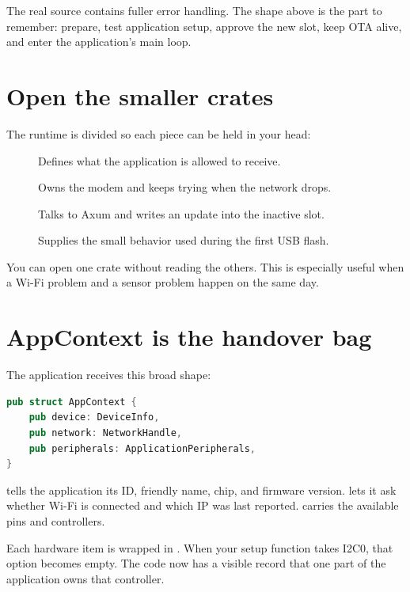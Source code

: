 The real source contains fuller error handling. The shape above is the part to remember: prepare, test application setup, approve the new slot, keep OTA alive, and enter the application's main loop.

\section{Open the smaller crates}

The runtime is divided so each piece can be held in your head:

\begin{description}
  \item[] Defines what the application is allowed to receive.
  \item[] Owns the modem and keeps trying when the network drops.
  \item[] Talks to Axum and writes an update into the inactive slot.
  \item[] Supplies the small behavior used during the first USB flash.
\end{description}

You can open one crate without reading the others. This is especially useful when a Wi-Fi problem and a sensor problem happen on the same day.

\section{AppContext is the handover bag}

The application receives this broad shape:

\begin{lstlisting}[language=Rust]
pub struct AppContext {
    pub device: DeviceInfo,
    pub network: NetworkHandle,
    pub peripherals: ApplicationPeripherals,
}
\end{lstlisting}

 tells the application its ID, friendly name, chip, and firmware version.  lets it ask whether Wi-Fi is connected and which IP was last reported.  carries the available pins and controllers.

Each hardware item is wrapped in . When your setup function takes I2C0, that option becomes empty. The code now has a visible record that one part of the application owns that controller.

